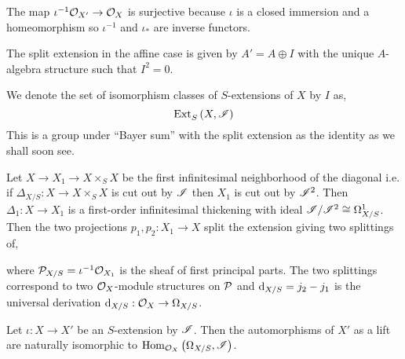 \documentclass[12pt]{article}
\begin{document}
\begin{rmk}
The map $\iota^{-1} \mathcal{O}_{X'} \to \mathcal{O}_{X}$ is surjective because $\iota$ is a closed immersion and a homeomorphism so $\iota^{-1}$ and $\iota_*$ are inverse functors.
\end{rmk}

\begin{rmk}
The split extension in the affine case is given by $A' = A \oplus I$ with the unique $A$-algebra structure such that $I^2 = 0$.
\end{rmk}

\begin{defn}
We denote the set of isomorphism classes of $S$-extensions of $X$ by $I$ as,
\[ \mathrm{Ext}^{}_{S} \left( X, \mathscr{I} \right) \]
This is a group under ``Bayer sum'' with the split extension as the identity as we shall soon see.
\end{defn}

\begin{example}
Let $X \to X_1 \to X \times_S X$ be the first infinitesimal neighborhood of the diagonal i.e. if $\Delta_{X/S} : X \to X \times_S X$ is cut out by $\mathscr{I}$ then $X_1$ is cut out by $\mathscr{I}^2$. Then $\Delta_1 : X \to X_1$ is a first-order infinitesimal thickening with ideal $\mathscr{I}/\mathscr{I}^2 \cong \Omega^1_{X/S}$. Then the two projections $p_1, p_2 : X_1 \to X$ split the extension giving two splittings of,
\begin{center}
\end{center}
where $\mathcal{P}_{X/S} = \iota^{-1} \mathcal{O}_{X_1}$ is the sheaf of first principal parts. The two splittings correspond to two $\mathcal{O}_{X}$-module structures on $\mathcal{P}$ and $\mathrm{d}_{X/S} = j_2 - j_1$ is the universal derivation $\mathrm{d}_{X/S} : \mathcal{O}_{X} \to \Omega_{X/S}$.
\end{example}

\begin{prop}
Let $\iota : X \to X'$ be an $S$-extension by $\mathscr{I}$. Then the automorphisms of $X'$ as a lift are naturally isomorphic to $\mathrm{Hom}_{\mathcal{O}_{X}} \left( \Omega_{X/S}, \mathscr{I} \right)$.
\end{prop}
\end{document}
